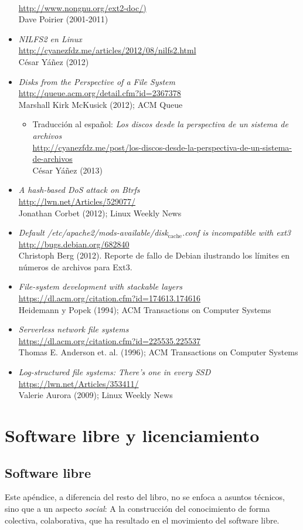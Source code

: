 \documentclass[11pt,fleqn]{book} %
\newcommand{\otrorec}[1]{ \\ {\small \url{#1}} \\ }
\begin{document}
\begin{itemize}
  \otrorec{http://www.nongnu.org/ext2-doc/)}
  Dave Poirier (2001-2011)
\item \emph{NILFS2 en Linux}
  \otrorec{http://cyanezfdz.me/articles/2012/08/nilfs2.html}
  César Yáñez (2012)
\item \emph{Disks from the Perspective of a File System}
  \otrorec{http://queue.acm.org/detail.cfm?id=2367378}
  Marshall Kirk McKusick (2012); ACM Queue
\begin{itemize}
\item Traducción al español: \emph{Los discos desde la perspectiva de un     sistema de archivos}
    \otrorec{http://cyanezfdz.me/post/los-discos-desde-la-perspectiva-de-un-sistema-de-archivos}
    César Yáñez (2013)
\end{itemize}
\item \emph{A hash-based DoS attack on Btrfs}
  \otrorec{http://lwn.net/Articles/529077/}
  Jonathan Corbet (2012); Linux Weekly News
\item \emph{Default /etc/apache2/mods-available/disk$_{\mathrm{cache}}$.conf is incompatible   with ext3}
  \otrorec{http://bugs.debian.org/682840}
  Christoph Berg (2012). Reporte de fallo de Debian ilustrando los
  límites en números de archivos para Ext3.
\item \emph{File-system development with stackable layers}
  \otrorec{https://dl.acm.org/citation.cfm?id=174613.174616}
  Heidemann y Popek (1994); ACM Transactions on Computer Systems
\item \emph{Serverless network file systems}
  \otrorec{https://dl.acm.org/citation.cfm?id=225535.225537}
  Thomas E. Anderson et. al. (1996); ACM Transactions on Computer
  Systems
\item \emph{Log-structured file systems: There's one in every SSD}
  \otrorec{https://lwn.net/Articles/353411/}
  Valerie Aurora (2009); Linux
  Weekly News
\end{itemize}


\appendix
\chapter{Software libre y licenciamiento}
\label{sec-8}
\section{Software libre}
\label{sec-8-1}
\label{SL}


Este apéndice, a diferencia del resto del libro, no se enfoca a
asuntos técnicos, sino que a un aspecto \emph{social}: A la construcción
del conocimiento de forma colectiva, colaborativa, que ha resultado en
el movimiento del software libre.
\end{document}
